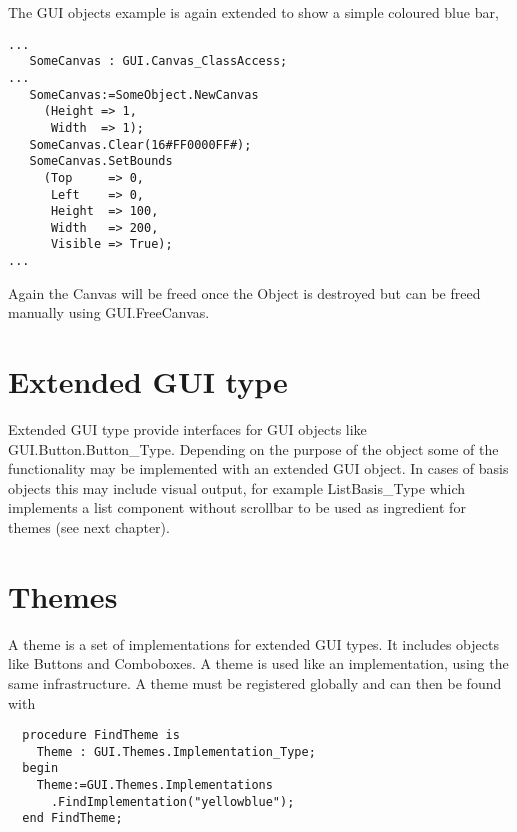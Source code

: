 \documentclass{article}
\begin{document}
The GUI objects example is again extended to show a simple coloured blue bar,
\begin{lstlisting}
...
   SomeCanvas : GUI.Canvas_ClassAccess;
...
   SomeCanvas:=SomeObject.NewCanvas
     (Height => 1,
      Width  => 1);
   SomeCanvas.Clear(16#FF0000FF#);
   SomeCanvas.SetBounds
     (Top     => 0,
      Left    => 0,
      Height  => 100,
      Width   => 200,
      Visible => True);
...
\end{lstlisting}
Again the Canvas will be freed once the Object is destroyed but can be
freed manually using GUI.FreeCanvas.

\section{Extended GUI type}

Extended GUI type provide interfaces for GUI objects like GUI.Button.Button\_Type.
Depending on the purpose of the object some of the functionality may be implemented
with an extended GUI object. In cases of basis objects this may include visual
output, for example ListBasis\_Type which implements a list component without scrollbar
to be used as ingredient for themes (see next chapter).

\section{Themes}

A theme is a set of implementations for extended GUI types. It includes objects like
Buttons and Comboboxes.
A theme is used like an implementation, using the same infrastructure.
A theme must be registered globally and can then be found with
\begin{lstlisting}
  procedure FindTheme is
    Theme : GUI.Themes.Implementation_Type;
  begin
    Theme:=GUI.Themes.Implementations
      .FindImplementation("yellowblue");
  end FindTheme;
\end{lstlisting}
\end{document}
